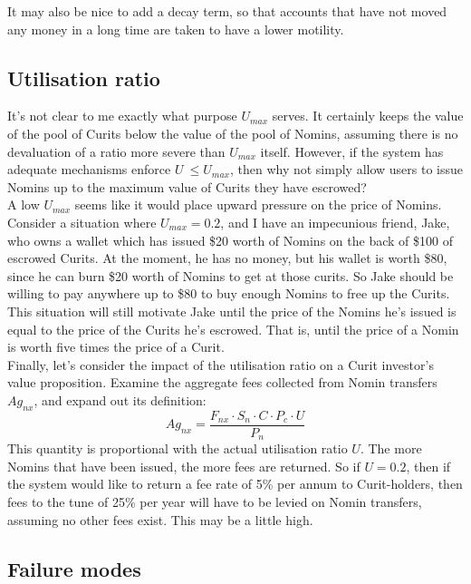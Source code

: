 \noindent It may also be nice to add a decay term, so that accounts that have not moved any money in a long time are taken to have a lower motility.


\pagebreak
\subsection{Utilisation ratio}

It's not clear to me exactly what purpose \(U_{max}\) serves. It certainly keeps the value of the pool of Curits below the value of the pool of Nomins, assuming there is no devaluation of a ratio more severe than \(U_{max}\) itself. However, if the system has adequate mechanisms enforce \(U\ \leq U_{max}\), then why not simply allow users to issue Nomins up to the maximum value of Curits they have escrowed? \\

\noindent A low \(U_{max}\) seems like it would place upward pressure on the price of Nomins. Consider a situation where \(U_{max} = 0.2\), and I have an impecunious friend, Jake, who owns a wallet which has issued \$20 worth of Nomins on the back of \$100 of escrowed Curits. At the moment, he has no
money, but his wallet is worth \$80, since he can burn \$20 worth of Nomins to get at those curits. So Jake should be willing to pay anywhere up to \$80 to buy enough Nomins to free up the Curits. This situation will still motivate Jake until the price of the Nomins he's issued is equal to the price of the Curits he's escrowed. That is, until the price of a Nomin is worth five times the price of a Curit.\\

\noindent Finally, let's consider the impact of the utilisation ratio on a Curit investor's value proposition. Examine the aggregate fees collected from Nomin transfers \(Ag_{nx}\), and expand out its definition:
\[Ag_{nx} = \frac{F_{nx} \cdot S_n \cdot C \cdot P_c \cdot U}{P_n}\]
This quantity is proportional with the actual utilisation ratio \(U\). The more Nomins that have been issued, the more fees are returned. So if \(U = 0.2\), then if the system would like to return a fee rate of 5\% per annum to Curit-holders, then fees to the tune of 25\% per year will have to be levied on Nomin transfers, assuming no other fees exist. This may be a little high.

\pagebreak
\subsection{Failure modes}
